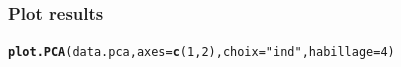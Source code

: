 \documentclass[aspectratio=169]{beamer}\usepackage[]{graphicx}\usepackage[]{xcolor}
\makeatletter
\newcommand{\hlnum}[1]{\textcolor[rgb]{0.686,0.059,0.569}{#1}}%
\newcommand{\hlstr}[1]{\textcolor[rgb]{0.192,0.494,0.8}{#1}}%
\newcommand{\hlstd}[1]{\textcolor[rgb]{0.345,0.345,0.345}{#1}}%
\newcommand{\hlkwc}[1]{\textcolor[rgb]{0.333,0.667,0.333}{#1}}%
\newcommand{\hlkwd}[1]{\textcolor[rgb]{0.737,0.353,0.396}{\textbf{#1}}}%
\newenvironment{kframe}{%
 \def\at@end@of@kframe{}%
 \ifinner\ifhmode%
  \def\at@end@of@kframe{\end{minipage}}%
  \begin{minipage}{\columnwidth}%
 \fi\fi%
 \def\FrameCommand##1{\hskip\@totalleftmargin \hskip-\fboxsep
 \colorbox{shadecolor}{##1}\hskip-\fboxsep
     \hskip-\linewidth \hskip-\@totalleftmargin \hskip\columnwidth}%
 \MakeFramed {\advance\hsize-\width
   \@totalleftmargin\z@ \linewidth\hsize
   \@setminipage}}%
 {\par\unskip\endMakeFramed%
 \at@end@of@kframe}
\newenvironment{knitrout}{}{} %
\makeatother
\begin{document}
% 
% 
% 
% 
% 

\begin{frame}[fragile]\frametitle{Plot results}
\begin{knitrout}
\color{fgcolor}\begin{kframe}
\begin{alltt}
\hlkwd{plot.PCA}\hlstd{(data.pca,} \hlkwc{axes} \hlstd{=} \hlkwd{c}\hlstd{(}\hlnum{1}\hlstd{,}\hlnum{2}\hlstd{),} \hlkwc{choix} \hlstd{=} \hlstr{"ind"}\hlstd{,} \hlkwc{habillage} \hlstd{=} \hlnum{4}\hlstd{)}
\end{alltt}
\end{kframe}
\end{knitrout}
\end{frame}


% 


% 
% 
% 
% 
% 
\end{document}
